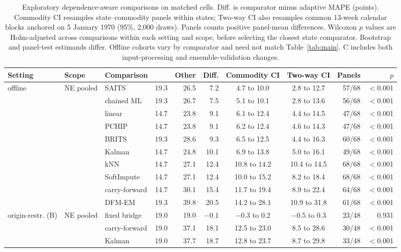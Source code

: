 \begin{table}[t]
\caption{Exploratory dependence-aware comparisons on matched cells. Diff. is comparator minus adaptive MAPE (points). Commodity CI resamples state--commodity panels within states; Two-way CI also resamples common 13-week calendar blocks anchored on 5 January 1970 (95\%, 2,000 draws). Panels counts positive panel-mean differences. Wilcoxon $p$ values are Holm-adjusted across comparisons within each setting and scope, before selecting the closest state comparator. Bootstrap and panel-test estimands differ. Offline cohorts vary by comparator and need not match Table~\ref{tab:main}. C includes both input-processing and ensemble-validation changes.}
\label{tab:inference}
\small
\setlength{\tabcolsep}{4.5pt}
\begin{tabular}{lll rrr cc rr}
\toprule
Setting & Scope & Comparison & \auto{} & Other & Diff. & Commodity CI & Two-way CI & Panels & $p$ \\
\midrule
offline & NE pooled & SAITS & 19.3 & 26.5 & 7.2 & 4.7 to 10.0 & 2.8 to 12.7 & 57/68 & $<$0.001 \\
 &  & chained ML & 19.3 & 26.7 & 7.5 & 5.1 to 10.1 & 2.8 to 13.6 & 56/68 & $<$0.001 \\
 &  & linear & 14.7 & 23.8 & 9.1 & 6.1 to 12.4 & 4.4 to 14.5 & 47/68 & $<$0.001 \\
 &  & PCHIP & 14.7 & 23.8 & 9.1 & 6.2 to 12.4 & 4.6 to 14.3 & 47/68 & $<$0.001 \\
 &  & BRITS & 19.3 & 28.6 & 9.3 & 6.5 to 12.5 & 4.4 to 16.3 & 60/68 & $<$0.001 \\
 &  & Kalman & 14.7 & 24.8 & 10.1 & 6.9 to 13.8 & 5.0 to 16.1 & 49/68 & $<$0.001 \\
 &  & kNN & 14.7 & 27.1 & 12.4 & 10.8 to 14.2 & 10.4 to 14.5 & 68/68 & $<$0.001 \\
 &  & SoftImpute & 14.7 & 27.1 & 12.4 & 10.0 to 15.2 & 8.2 to 18.4 & 68/68 & $<$0.001 \\
 &  & carry-forward & 14.7 & 30.1 & 15.4 & 11.7 to 19.4 & 8.9 to 22.4 & 64/68 & $<$0.001 \\
 &  & DFM-EM & 19.3 & 39.8 & 20.5 & 14.2 to 28.1 & 10.9 to 31.8 & 61/68 & $<$0.001 \\
\midrule
origin-restr. (B) & NE pooled & fixed bridge & 19.0 & 19.0 & $-0.1$ & $-0.3$ to 0.2 & $-0.5$ to 0.3 & 23/48 & 0.931 \\
 &  & carry-forward & 19.0 & 37.1 & 18.1 & 12.5 to 23.0 & 8.5 to 28.6 & 30/48 & $<$0.001 \\
 &  & Kalman & 19.0 & 37.7 & 18.7 & 12.8 to 23.7 & 8.7 to 29.8 & 33/48 & $<$0.001 \\

\end{tabular}
\end{table}
